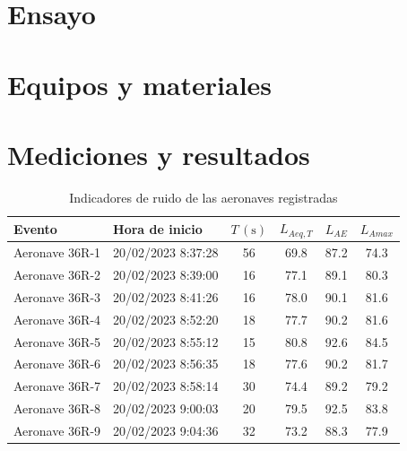 \documentclass[11pt]{article}
\begin{document}
\section{Ensayo}
\section{Equipos y materiales}
\section{Mediciones y resultados}

\begin{table}[htbp]
    \centering
    \caption{Indicadores de ruido de las aeronaves registradas}
    \begin{tabular}{|l|l|c|c|c|c|} \hline
        Evento                                              & Hora de inicio     & $T \, (\unit{\s})$ & $L_{Aeq,T}$ & $L_{AE}$ & $L_{Amax}$ \\ \hline
        \rowcolor[rgb]{ .867,  .922,  .969} Aeronave 36R-1  & 20/02/2023 8:37:28 & 56                 & 69.8        & 87.2     & 74.3       \\ \hline
        \rowcolor[rgb]{ .867,  .922,  .969} Aeronave 36R-2  & 20/02/2023 8:39:00 & 16                 & 77.1        & 89.1     & 80.3       \\ \hline
        \rowcolor[rgb]{ .867,  .922,  .969} Aeronave 36R-3  & 20/02/2023 8:41:26 & 16                 & 78.0        & 90.1     & 81.6       \\ \hline
        \rowcolor[rgb]{ .867,  .922,  .969} Aeronave 36R-4  & 20/02/2023 8:52:20 & 18                 & 77.7        & 90.2     & 81.6       \\ \hline
        \rowcolor[rgb]{ .867,  .922,  .969} Aeronave 36R-5  & 20/02/2023 8:55:12 & 15                 & 80.8        & 92.6     & 84.5       \\ \hline
        \rowcolor[rgb]{ .867,  .922,  .969} Aeronave 36R-6  & 20/02/2023 8:56:35 & 18                 & 77.6        & 90.2     & 81.7       \\ \hline
        \rowcolor[rgb]{ .867,  .922,  .969} Aeronave 36R-7  & 20/02/2023 8:58:14 & 30                 & 74.4        & 89.2     & 79.2       \\ \hline
        \rowcolor[rgb]{ .867,  .922,  .969} Aeronave 36R-8  & 20/02/2023 9:00:03 & 20                 & 79.5        & 92.5     & 83.8       \\ \hline
        \rowcolor[rgb]{ .867,  .922,  .969} Aeronave 36R-9  & 20/02/2023 9:04:36 & 32                 & 73.2        & 88.3     & 77.9       \\ \hline

\end{tabular}
\end{table}
\end{document}
